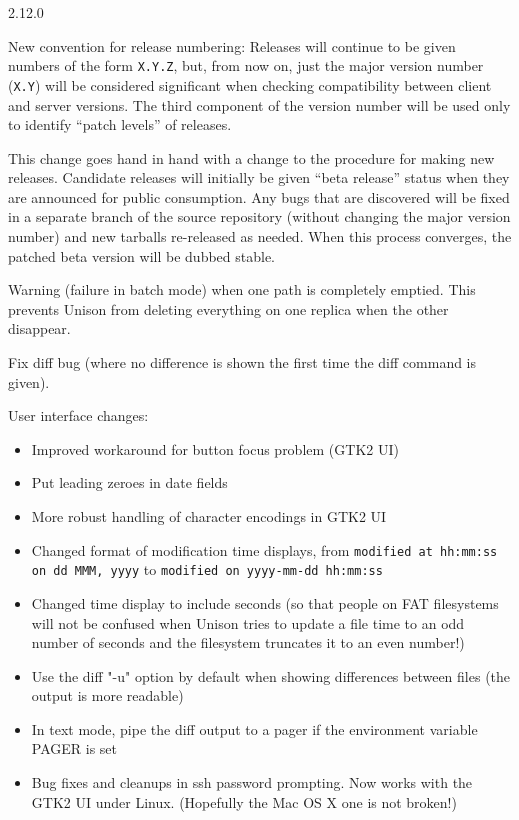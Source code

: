 \begin{changesfromversion}{2.12.0}
\item New convention for release numbering: Releases will continue to be
given numbers of the form \verb|X.Y.Z|, but,
from now on, just the major version number (\verb|X.Y|) will be considered
significant when checking compatibility between client and server versions.
The third component of the version number will be used only to identify
``patch levels'' of releases.

This change goes hand in hand with a change to the procedure for making new
releases.  Candidate releases will initially be given ``beta release''
status when they are announced for public consumption.  Any bugs that are
discovered will be fixed in a separate branch of the source repository
(without changing the major version number) and new tarballs re-released as
needed.  When this process converges, the patched beta version will be
dubbed stable.
\item Warning (failure in batch mode) when one path is completely emptied.
  This prevents Unison from deleting everything on one replica when
  the other disappear.
\item Fix diff bug (where no difference is shown the first time the diff
  command is given).
\item User interface changes:
\begin{itemize}
\item Improved workaround for button focus problem (GTK2 UI)
\item Put leading zeroes in date fields
\item More robust handling of character encodings in GTK2 UI
\item Changed format of modification time displays, from \verb|modified at hh:mm:ss on dd MMM, yyyy|
to \verb|modified on yyyy-mm-dd hh:mm:ss|
\item Changed time display to include seconds (so that people on FAT
  filesystems will not be confused when Unison tries to update a file
  time to an odd number of seconds and the filesystem truncates it to
  an even number!)
\item Use the diff "-u" option by default when showing differences between files
  (the output is more readable)
\item In text mode, pipe the diff output to a pager if the environment
  variable PAGER is set
\item Bug fixes and cleanups in ssh password prompting.  Now works with
  the GTK2 UI under Linux.  (Hopefully the Mac OS X one is not broken!)

\end{itemize}
\end{changesfromversion}
